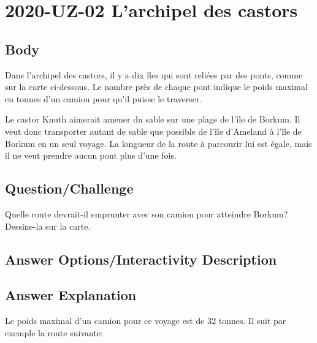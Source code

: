 \documentclass[a4paper,11pt]{report}
\newcommand{\taskGraphicsFolder}{..}
\begin{document}
\section*{\centering{} 2020-UZ-02 L’archipel des castors}


\subsection*{Body}

Dans l’archipel des castors, il y a dix îles qui sont reliées par des ponts, comme sur la carte ci-dessous. Le nombre près de chaque pont indique le poids maximal en tonnes d’un camion pour qu’il puisse le traverser.

Le castor Knuth aimerait amener du sable sur une plage de l’île de Borkum. Il veut donc transporter autant de sable que possible de l’île d’Ameland à l’île de Borkum en un seul voyage. La longueur de la route à parcourir lui est égale, mais il ne veut prendre aucun pont plus d’une fois.

{\em

\subsection*{Question/Challenge}

Quelle route devrait-il emprunter avec son camion pour atteindre Borkum? Dessine-la sur la carte.

{\centering%
\par}

}\begingroup
\renewcommand{\arraystretch}{1.5}
\subsection*{Answer Options/Interactivity Description}



\endgroup

\subsection*{Answer Explanation}

Le poids maximal d’un camion pour ce voyage est de $32$ tonnes. Il suit par exemple la route suivante:

{\centering%
\par}
\end{document}
